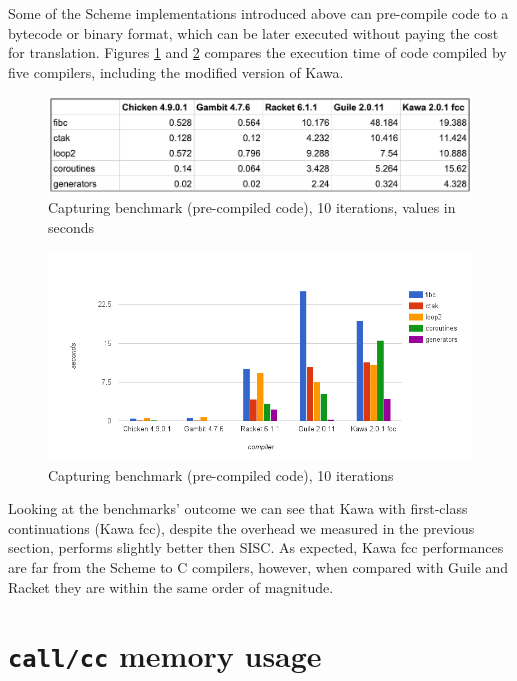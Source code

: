 \documentclass[12pt,a4paper,oneside,openright]{book}
\begin{document}
Some of the Scheme implementations introduced above can pre-compile code
to a bytecode or binary format, which can be later executed without
paying the cost for translation. Figures \ref{compiled-tab} and
\ref{compiled} compares the execution time of code compiled by five
compilers, including the modified version of Kawa.

\begin{figure}[htbp]
\centering
\includegraphics{figures/compiled-table.pdf}
\caption{Capturing benchmark (pre-compiled code), 10 iterations, values
in seconds \label{compiled-tab}}
\end{figure}

\begin{figure}[htbp]
\centering
\includegraphics{figures/compiled.png}
\caption{Capturing benchmark (pre-compiled code), 10 iterations
\label{compiled}}
\end{figure}

Looking at the benchmarks' outcome we can see that Kawa with first-class
continuations (Kawa fcc), despite the overhead we measured in the
previous section, performs slightly better then SISC. As expected, Kawa
fcc performances are far from the Scheme to C compilers, however, when
compared with Guile and Racket they are within the same order of
magnitude.

\section{\texorpdfstring{\texttt{call/cc} memory
usage}{call/cc memory usage}}\label{callcc-memory-usage}
\end{document}
